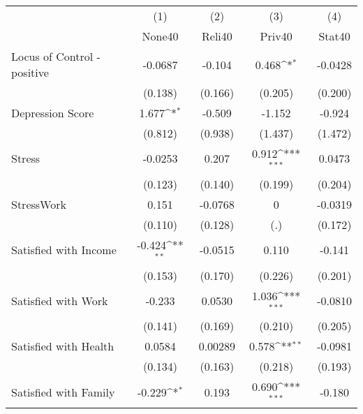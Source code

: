 {
\def\sym#1{\ifmmode^{#1}\else\(^{#1}\)\fi}
\begin{tabular}{l*{4}{c}}
\hline\hline
            &\multicolumn{1}{c}{(1)}&\multicolumn{1}{c}{(2)}&\multicolumn{1}{c}{(3)}&\multicolumn{1}{c}{(4)}\\
            &\multicolumn{1}{c}{None40}&\multicolumn{1}{c}{Reli40}&\multicolumn{1}{c}{Priv40}&\multicolumn{1}{c}{Stat40}\\
\hline
Locus of Control - positive&     -0.0687         &      -0.104         &       0.468\sym{*}  &     -0.0428         \\
            &     (0.138)         &     (0.166)         &     (0.205)         &     (0.200)         \\
[1em]
Depression Score&       1.677\sym{*}  &      -0.509         &      -1.152         &      -0.924         \\
            &     (0.812)         &     (0.938)         &     (1.437)         &     (1.472)         \\
[1em]
Stress      &     -0.0253         &       0.207         &       0.912\sym{***}&      0.0473         \\
            &     (0.123)         &     (0.140)         &     (0.199)         &     (0.204)         \\
[1em]
StressWork  &       0.151         &     -0.0768         &           0         &     -0.0319         \\
            &     (0.110)         &     (0.128)         &         (.)         &     (0.172)         \\
[1em]
Satisfied with Income&      -0.424\sym{**} &     -0.0515         &       0.110         &      -0.141         \\
            &     (0.153)         &     (0.170)         &     (0.226)         &     (0.201)         \\
[1em]
Satisfied with Work&      -0.233         &      0.0530         &       1.036\sym{***}&     -0.0810         \\
            &     (0.141)         &     (0.169)         &     (0.210)         &     (0.205)         \\
[1em]
Satisfied with Health&      0.0584         &     0.00289         &       0.578\sym{**} &     -0.0981         \\
            &     (0.134)         &     (0.163)         &     (0.218)         &     (0.193)         \\
[1em]
Satisfied with Family&      -0.229\sym{*}  &       0.193         &       0.690\sym{***}&      -0.180         \\

\end{tabular}}
